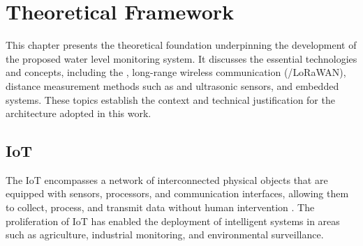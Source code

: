 \chapter{Theoretical Framework} \label{cap:theoretical}





This chapter presents the theoretical foundation underpinning the development of the proposed water level monitoring system. It discusses the essential technologies and concepts, including the , long-range wireless communication (/\gls{LoRaWAN}), distance measurement methods such as  and ultrasonic sensors, and embedded systems. These topics establish the context and technical justification for the architecture adopted in this work.

\section{IoT}

The \gls{IoT} encompasses a network of interconnected physical objects that are equipped with sensors, processors, and communication interfaces, allowing them to collect, process, and transmit data without human intervention . The proliferation of \gls{IoT} has enabled the deployment of intelligent systems in areas such as agriculture, industrial monitoring, and environmental surveillance. \cite{Madakam:2015,javaid_2021_sensors}

